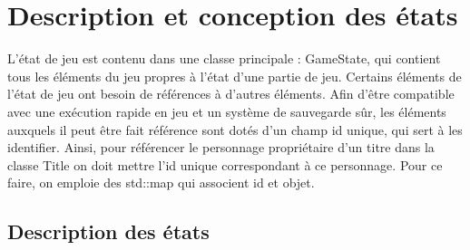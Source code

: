 \documentclass[a4paper,12pt]{article}
\begin{document}
\clearpage
\section{Description et conception des états}

L'état de jeu est contenu dans une classe principale : GameState, qui contient tous les éléments du jeu propres à l'état d'une partie de jeu.
Certains éléments de l'état de jeu ont besoin de références à d'autres éléments. Afin d'être compatible avec une exécution rapide en jeu et un système de sauvegarde sûr, les éléments auxquels il peut être fait référence sont dotés d'un champ id unique, qui sert à les identifier. Ainsi, pour référencer le personnage propriétaire d'un titre dans la classe Title on doit mettre l'id unique correspondant à ce personnage. Pour ce faire, on emploie des std::map qui associent id et objet.

\subsection{Description des états}
\end{document}
